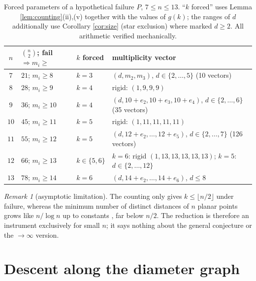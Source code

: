 \documentclass[11pt]{article}
\theoremstyle{definition}
\theoremstyle{remark}
\newtheorem{remark}[theorem]{Remark}
\begin{document}
\begin{table}[ht]
\centering
\caption{Forced parameters of a hypothetical failure $P$, $7 \le n \le 13$. ``$k$
forced'' uses Lemma \ref{lem:counting}(ii),(v) together with the values of $g(k)$;
the ranges of $d$ additionally use Corollary \ref{cor:size} (star exclusion) where marked
$d \ge 2$. All arithmetic verified mechanically.}
\label{tab:profiles}
\begin{tabular}{@{}clll@{}}
\toprule
$n$ & $\binom{n}{2}$; fail $\Rightarrow m_i \ge$ & $k$ forced & multiplicity vector \\
\midrule
$7$ & $21$; $m_i \ge 8$ & $k = 3$ & $(d, m_2, m_3)$, $d \in \{2,\dots,5\}$ (10 vectors) \\
$8$ & $28$; $m_i \ge 9$ & $k = 4$ & rigid: $(1, 9, 9, 9)$ \\
$9$ & $36$; $m_i \ge 10$ & $k = 4$ & $(d, 10{+}e_2, 10{+}e_3, 10{+}e_4)$, $d \in \{2,\dots,6\}$ (35 vectors) \\
$10$ & $45$; $m_i \ge 11$ & $k = 5$ & rigid: $(1, 11, 11, 11, 11)$ \\
$11$ & $55$; $m_i \ge 12$ & $k = 5$ & $(d, 12{+}e_2, \dots, 12{+}e_5)$, $d \in \{2,\dots,7\}$ (126 vectors) \\
$12$ & $66$; $m_i \ge 13$ & $k \in \{5, 6\}$ & $k{=}6$: rigid $(1, 13, 13, 13, 13, 13)$; $k{=}5$: $d \in \{2,\dots,12\}$ \\
$13$ & $78$; $m_i \ge 14$ & $k = 6$ & $(d, 14{+}e_2, \dots, 14{+}e_6)$, $d \le 8$ \\
\bottomrule
\end{tabular}
\end{table}

\begin{remark}[asymptotic limitation]
The counting only gives $k \le \lfloor n/2 \rfloor$ under failure, whereas the minimum
number of distinct distances of $n$ planar points grows like $n/\log n$ up to constants
\cite{GuthKatz15}, far below $n/2$. The reduction is therefore an instrument exclusively
for small $n$; it says nothing about the general conjecture or the $\to \infty$ version.
\end{remark}

\section{Descent along the diameter graph}\label{sec:descent}
\end{document}
